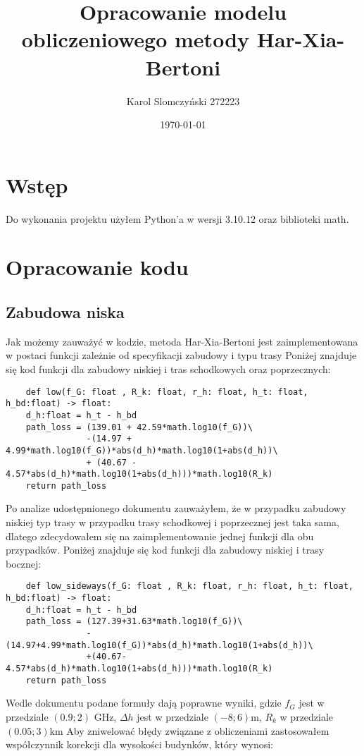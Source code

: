 \documentclass{article}
\title{Opracowanie modelu obliczeniowego metody Har-Xia-Bertoni}
\author{Karol Slomczyński 272223}
\date{\today}
\begin{document}
\maketitle

\section{Wstęp}
Do wykonania projektu użyłem Python'a w wersji 3.10.12 oraz biblioteki math.


\section{Opracowanie kodu}
\subsection{Zabudowa niska}
Jak możemy zauważyć w kodzie, metoda Har-Xia-Bertoni jest 
zaimplementowana w postaci funkcji zależnie od specyfikacji zabudowy i typu trasy
Poniżej znajduje się kod funkcji dla zabudowy niskiej i tras schodkowych oraz poprzecznych:
\begin{verbatim}
    def low(f_G: float , R_k: float, r_h: float, h_t: float, h_bd:float) -> float:
    d_h:float = h_t - h_bd
    path_loss = (139.01 + 42.59*math.log10(f_G))\
                -(14.97 + 4.99*math.log10(f_G))*abs(d_h)*math.log10(1+abs(d_h))\
                + (40.67 - 4.57*abs(d_h)*math.log10(1+abs(d_h)))*math.log10(R_k)
    return path_loss
\end{verbatim}
Po analize udostępnionego dokumentu zauważyłem, że w przypadku zabudowy niskiej typ trasy w przypadku trasy schodkowej i poprzecznej
jest taka sama, dlatego zdecydowałem się na zaimplementowanie jednej funkcji dla obu przypadków.
\newline
Poniżej znajduje się kod funkcji dla zabudowy niskiej i trasy bocznej:

\begin{verbatim}
    def low_sideways(f_G: float , R_k: float, r_h: float, h_t: float, h_bd:float) -> float:
    d_h:float = h_t - h_bd
    path_loss = (127.39+31.63*math.log10(f_G))\
                -(14.97+4.99*math.log10(f_G))*abs(d_h)*math.log10(1+abs(d_h))\
                +(40.67-4.57*abs(d_h)*math.log10(1+abs(d_h)))*math.log10(R_k)
    return path_loss
\end{verbatim}
Wedle dokumentu podane formuły dają poprawne wyniki, gdzie $f_G$ jest w przedziale $( 0.9; 2 )$ GHz, $\Delta h$ jest w przedziale $(-8;6)$m, $R_k$ w przedziale $(0.05;3)$km
\newline
Aby zniwelować błędy związane z obliczeniami zastosowałem współczynnik korekcji dla wysokości budynków, który wynosi:
\end{document}
